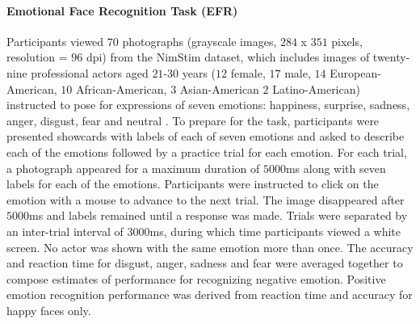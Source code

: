 \documentclass[utf8]{stylesheet}
\begin{document}
\paragraph{Emotional Face Recognition Task (EFR)} Participants viewed $70$ photographs (grayscale images, $284$ x $351$ pixels, resolution = $96$ dpi) from the NimStim dataset, which includes images of twenty-nine professional actors aged $21$-$30$ years ($12$ female, $17$ male, $14$ European-American, $10$ African-American, $3$ Asian-American $2$ Latino-American) instructed to pose for expressions of seven emotions: happiness, surprise, sadness, anger, disgust, fear and neutral \citep{tottenham2009nimstim}. To prepare for the task, participants were presented showcards with labels of each of seven emotions and asked to describe each of the emotions followed by a practice trial for each emotion. For each trial, a photograph appeared for a maximum duration of $5000$ms along with seven labels for each of the emotions. Participants were instructed to click on the emotion with a mouse to advance to the next trial. The image disappeared after $5000$ms and labels remained until a response was made. Trials were separated by an inter-trial interval of $3000$ms, during which time participants viewed a white screen. No actor was shown with the same emotion more than once. The accuracy and reaction time for disgust, anger, sadness and fear were averaged together to compose estimates of performance for recognizing negative emotion. Positive emotion recognition performance was derived from reaction time and accuracy for happy faces only. 
\end{document}
